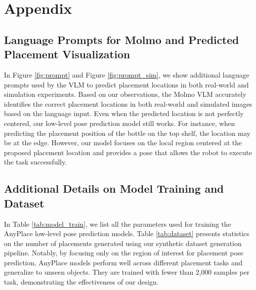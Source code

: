 
\clearpage  

\section*{Appendix}

\subsection{Language Prompts for Molmo and Predicted Placement Visualization}
 In Figure \ref{fig:prompt} and Figure \ref{fig:prompt_sim}, we show additional language prompts used by the VLM to predict placement locations in both real-world and simulation experiments. Based on our observations, the Molmo VLM accurately identifies the correct placement locations in both real-world and simulated images based on the language input. Even when the predicted location is not perfectly centered, our low-level pose prediction model still works. For instance, when predicting the placement position of the bottle on the top shelf, the location may be at the edge. However, our model focuses on the local region centered at the proposed placement location and provides a pose that allows the robot to execute the task successfully.


\subsection{Additional Details on Model Training and Dataset}
In Table \ref{tab:model_train}, we list all the parameters used for training the AnyPlace low-level pose prediction models. Table \ref{tab:dataset} presents statistics on the number of placements generated using our synthetic dataset generation pipeline. Notably, by focusing only on the region of interest for placement pose prediction, AnyPlace models perform well across different placement tasks and generalize to unseen objects. They are trained with fewer than 2,000 samples per task, demonstrating the effectiveness of our design.


